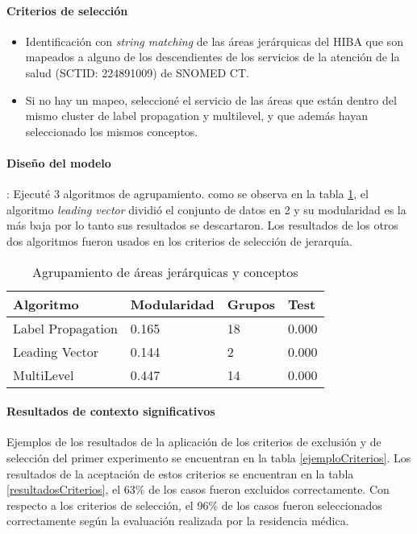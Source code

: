 \paragraph{Criterios de selección}
\begin{itemize}
\item Identificación con \textit{string matching} de las áreas jerárquicas del \acrshort{HIBA} que son mapeados a  alguno de los descendientes de  los servicios de la atención de la salud (SCTID: 224891009) de SNOMED CT.  
\item Si no hay un mapeo, seleccioné el servicio de las áreas que están dentro del mismo cluster de label propagation y multilevel, y que además hayan seleccionado los mismos conceptos.
\end{itemize}

\paragraph{Diseño del modelo}: Ejecuté 3 algoritmos de agrupamiento. como se observa en la tabla \ref{clusteringAreas}, el algoritmo \textit{leading vector} dividió el conjunto de datos en 2 y su modularidad es la más baja por lo tanto sus resultados se descartaron.  Los resultados de los otros dos algoritmos fueron usados en los criterios de selección de jerarquía.

\begin{table}[htb]
\centering
\caption{Agrupamiento de áreas jerárquicas y conceptos}
\label{clusteringAreas}
\begin{tabular}{@{}llll@{}}
\toprule
Algoritmo         & Modularidad & Grupos & Test \\ \midrule
Label Propagation & 0.165       & 18     &   0.000   \\
Leading Vector    & 0.144       & 2      &     0.000 \\
MultiLevel        & 0.447       & 14     &     0.000 \\ \bottomrule
\end{tabular}
\end{table}

\paragraph{Resultados de contexto significativos}

Ejemplos de los resultados de la aplicación de los criterios de exclusión y de selección del primer experimento se encuentran en la tabla \ref{ejemploCriterios}. Los resultados de la aceptación de estos criterios se encuentran en la tabla \ref{resultadosCriterios}, el \num{63}\% de los casos fueron excluidos correctamente. Con respecto a los criterios de selección, el \num{96}\% de los casos fueron seleccionados correctamente según la evaluación realizada por la residencia médica.

